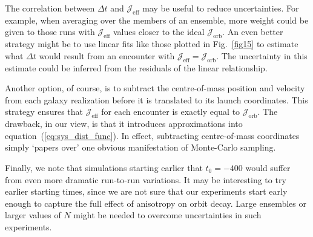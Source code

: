 \documentclass[fleqn,usenatbib]{mnras}
\begin{document}
The correlation between $\Delta t$ and $\mathcal{J}_\mathrm{eff}$ may be useful to reduce uncertainties. For example, when averaging over the members of an ensemble, more weight could be given to those runs with $\mathcal{J}_\mathrm{eff}$ values closer to the ideal $\mathcal{J}_\mathrm{orb}$. An even better strategy might be to use linear fits like those plotted in Fig.~\ref{fig15} to estimate what $\Delta t$ would result from an encounter with $\mathcal{J}_\mathrm{eff} = \mathcal{J}_\mathrm{orb}$. The uncertainty in this estimate could be inferred from the residuals of the linear relationship.

Another option, of course, is to subtract the centre-of-mass position and velocity from each galaxy realization before it is translated to its launch coordinates. This strategy ensures that $\mathcal{J}_\mathrm{eff}$ for each encounter is exactly equal to $\mathcal{J}_\mathrm{orb}$. The drawback, in our view, is that it introduces approximations into equation~(\ref{eq:sys_dist_func}). In effect, subtracting centre-of-mass coordinates simply `papers over' one obvious manifestation of Monte-Carlo sampling.

Finally, we note that simulations starting earlier that $t_{0} = -400$ would suffer from even more dramatic run-to-run variations. It may be interesting to try earlier starting times, since we are not sure that our experiments start early enough to capture the full effect of anisotropy on orbit decay. Large ensembles or larger values of $N$ might be needed to overcome uncertainties in such experiments.

\bsp	%
\label{lastpage}
\end{document}

